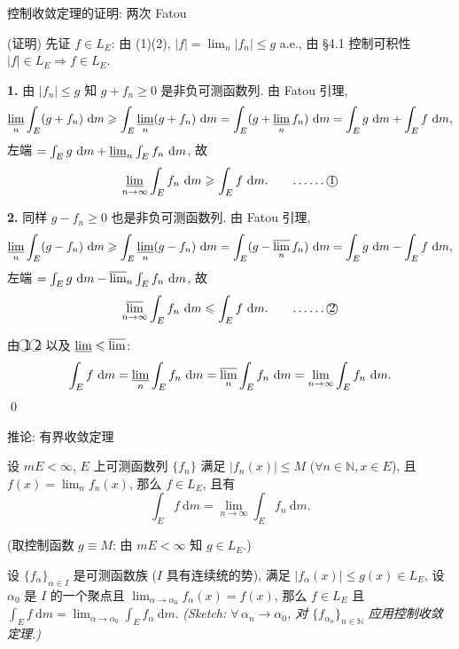 \begin{frame}{控制收敛定理的证明: 两次 Fatou}

\startproof[bg=yellow, fg=red](证明)
先证 $f \in L_E$: 由 (1)(2), $|f| = \lim_n |f_n| \leqslant g$ a.e., 由 \S 4.1 控制可积性
$|f| \in L_E \Rightarrow f \in L_E$.

\pause

\textbf{1\textdegree.} 由 $|f_n| \leqslant g$ 知 $g + f_n \geqslant 0$ 是非负可测函数列. 由 Fatou 引理,
\[
\varliminf_n \int_E (g + f_n) ~ \mathrm{d} m
\geqslant \int_E \varliminf_n (g + f_n) ~ \mathrm{d} m
= \int_E (g + \varliminf_n f_n) ~ \mathrm{d} m
= \int_E g ~ \mathrm{d} m + \int_E f ~ \mathrm{d} m ,
\]
左端 $= \int_E g ~ \mathrm{d} m + \varliminf_n \int_E f_n ~ \mathrm{d} m$, 故
\[
\varliminf_{n \to \infty} \int_E f_n ~ \mathrm{d} m \geqslant \int_E f ~ \mathrm{d} m .
\qquad \text{……\textcircled{1}}
\]

\pause

\textbf{2\textdegree.} 同样 $g - f_n \geqslant 0$ 也是非负可测函数列. 由 Fatou 引理,
\[
\varliminf_n \int_E (g - f_n) ~ \mathrm{d} m
\geqslant \int_E \varliminf_n (g - f_n) ~ \mathrm{d} m
= \int_E (g - \varlimsup_n f_n) ~ \mathrm{d} m
= \int_E g ~ \mathrm{d} m - \int_E f ~ \mathrm{d} m ,
\]
左端 $= \int_E g ~ \mathrm{d} m - \varlimsup_n \int_E f_n ~ \mathrm{d} m$, 故
\[
\varlimsup_{n \to \infty} \int_E f_n ~ \mathrm{d} m \leqslant \int_E f ~ \mathrm{d} m .
\qquad \text{……\textcircled{2}}
\]

\pause

由 \textcircled{1} \textcircled{2} 以及 $\varliminf \leqslant \varlimsup$:
\[
\int_E f ~ \mathrm{d} m
= \varliminf_n \int_E f_n ~ \mathrm{d} m
= \varlimsup_n \int_E f_n ~ \mathrm{d} m
= \lim_{n \to \infty} \int_E f_n ~ \mathrm{d} m .
\]
\qed

\end{frame}


\begin{frame}{推论: 有界收敛定理}

\begin{cor}[有界收敛]
设 $mE < \infty$, $E$ 上可测函数列 $\{f_n\}$ 满足 $|f_n(x)| \leqslant M$
($\forall n \in \mathbb{N}, x \in E$), 且 $f(x) = \lim_n f_n(x)$, 那么 $f \in L_E$, 且有
\[
\int_E f ~ \mathrm{d} m = \lim_{n \to \infty} \int_E f_n ~ \mathrm{d} m .
\]
\end{cor}

(取控制函数 $g \equiv M$: 由 $mE < \infty$ 知 $g \in L_E$.)

\pause

\begin{remark}[推广到连续参数]
设 $\{f_\alpha\}_{\alpha \in I}$ 是可测函数族 ($I$ 具有连续统的势), 满足
$|f_\alpha(x)| \leqslant g(x) \in L_E$, 设 $\alpha_0$ 是 $I$ 的一个聚点且
$\lim_{\alpha \to \alpha_0} f_\alpha(x) = f(x)$, 那么 $f \in L_E$ 且
$\int_E f ~ \mathrm{d} m = \lim_{\alpha \to \alpha_0} \int_E f_\alpha ~ \mathrm{d} m$.
\emph{(Sketch: $\forall\, \alpha_n \to \alpha_0$, 对 $\{f_{\alpha_n}\}_{n \in \mathbb{N}}$
应用控制收敛定理.)}
\end{remark}

\end{frame}

